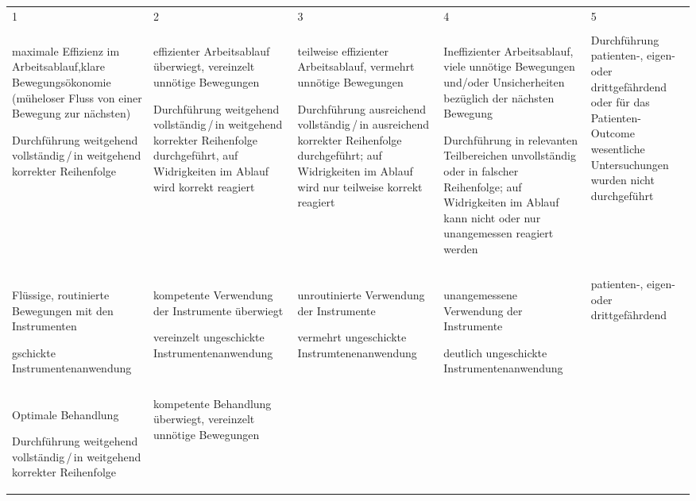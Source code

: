 \begin{gWideParEnv}

\begin{tabulary}{\linewidth}{LLLLL}
1 & 2 & 3 & 4 & 5
\\\addlinespace\hline\addlinespace
{}
\\\addlinespace
maximale Effizienz im Arbeitsablauf,klare Bewegungsökonomie (müheloser Fluss
von einer Bewegung zur nächsten) 

Durchführung weitgehend vollständig\,/\,in weitgehend korrekter Reihenfolge
&
effizienter Arbeitsablauf überwiegt, vereinzelt unnötige Bewegungen

Durchführung weitgehend vollständig\,/\,in weitgehend korrekter Reihenfolge
durchgeführt, auf Widrigkeiten im Ablauf wird korrekt reagiert
&
teilweise effizienter Arbeitsablauf, vermehrt unnötige Bewegungen

Durchführung ausreichend vollständig\,/\,in ausreichend korrekter Reihenfolge
durchgeführt; auf Widrigkeiten im Ablauf wird nur teilweise korrekt reagiert
&
Ineffizienter Arbeitsablauf, viele unnötige Bewegungen und/oder Unsicherheiten
bezüglich der nächsten Bewegung

Durchführung in relevanten Teilbereichen unvollständig oder in falscher
Reihenfolge; auf Widrigkeiten im Ablauf kann nicht oder nur unangemessen
reagiert werden
&
Durchführung patienten-, eigen- oder drittgefährdend oder für das
Patienten-Outcome wesentliche Untersuchungen wurden nicht durchgeführt
\\\addlinespace\hline\addlinespace
{}
\\\addlinespace
Flüssige, routinierte Bewegungen mit den Instrumenten

gschickte Instrumentenanwendung
&
kompetente Verwendung der Instrumente überwiegt

vereinzelt ungeschickte Instrumentenanwendung
&
unroutinierte Verwendung der Instrumente

vermehrt ungeschickte Instrumtenenanwendung
&
unangemessene Verwendung der Instrumente

deutlich ungeschickte Instrumentenanwendung
&
patienten-, eigen- oder drittgefährdend
\\\addlinespace\hline\addlinespace
{}
\\
Optimale Behandlung

Durchführung weitgehend vollständig\,/\,in weitgehend korrekter Reihenfolge
&
kompetente Behandlung überwiegt, vereinzelt unnötige Bewegungen


\end{tabulary}
\end{gWideParEnv}
